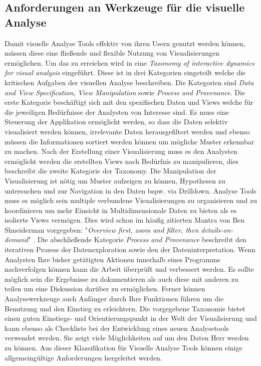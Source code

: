 \documentclass[draft=false
              ,paper=a4
              ,twoside=false
              ,fontsize=11pt
              ,headsepline
              ,BCOR10mm
              ,DIV11
              ]{scrbook}
\begin{document}

\subsection{Anforderungen an Werkzeuge für die visuelle Analyse} %
\label{sub:anforderungen_an_werkzeuge}
Damit visuelle Analyse Tools effektiv von ihren Usern genutzt werden können, müssen diese eine fließende und flexible Nutzung von Visualisierungen ermöglichen. Um das zu erreichen wird in \cite{heer_interactive_2012} eine \textit{Taxonomy of interactive dynamics for visual analysis} eingeführt. Diese ist in drei Kategorien eingeteilt welche die kritischen Aufgaben der visuellen Analyse beschreiben. Die Kategorien sind \textit{Data and View Specification}, \textit{View Manipulation} sowie \textit{Process and Provenance}. Die erste Kategorie beschäftigt sich mit den spezifischen Daten und Views welche für die jeweiligen Bedürfnisse der Analysten von Interesse sind. Es muss eine Steuerung der Applikation ermöglicht werden, so dass die Daten selektiv visualisiert werden können, irrelevante Daten herausgefiltert werden und ebenso müssen die Informationen sortiert werden können um mögliche Muster erkennbar zu machen. Nach der Erstellung einer Visualisierung muss es den Analysten ermöglicht werden die erstellten Views nach Bedürfnis zu manipulieren, dies beschreibt die zweite Kategorie der Taxonomy. Die Manipulation der Visualisierung ist nötig um Muster aufzeigen zu können, Hypothesen zu untersuchen und zur Navigation in den Daten bspw. via Drilldown. Analyse Tools muss es möglich sein multiple verbundene Visualisierungen zu organisieren und zu koordinieren um mehr Einsicht in Multidimensionale Daten zu bieten als es isolierte Views vermögen. Dies wird schon im häufig zitierten Mantra von Ben Shneiderman vorgegeben: "\textit{Overview first, zoom and filter, then details-on-demand}" \cite{shneiderman_the_eyes_1996}. Die abschließende Kategorie \textit{Process and Provenance} beschreibt den iterativen Prozess der Datenexploration sowie den der Dateninterpretation. Wenn Analysten Ihre bisher getätigten Aktionen innerhalb eines Programms nachverfolgen können kann die Arbeit überprüft und verbessert werden. Es sollte möglich sein die Ergebnisse zu dokumentieren als auch diese mit anderen zu teilen um eine Diskussion darüber zu ermöglichen. Ferner können Analysewerkzeuge auch Anfänger durch Ihre Funktionen führen um die Benutzung und den Einstieg zu erleichtern.
Die vorgegebene Taxonomie bietet einen guten Einstiegs- und Orientierungspunkt in der Welt der Visualisierung und kann ebenso als Checkliste bei der Entwicklung eines neuen Analysetools verwendet werden. Sie zeigt viele Möglichkeiten auf um den Daten Herr werden zu können. Aus dieser Klassifikation für Visuelle Analyse Tools können einige allgemeingültige Anforderungen hergeleitet werden.
\end{document}

